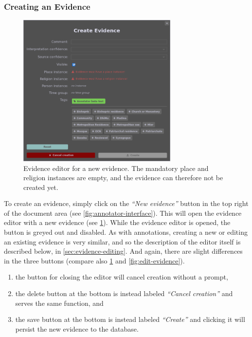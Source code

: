 \subsubsection{Creating an Evidence}
\label{sec:evidence-creation}

\begin{figure}[htb]
  \centering
  \includegraphics[width=8cm]{../src/assets/annotator-documentation/create-evidence.png}

  \caption{
    Evidence editor for a new evidence.
    The mandatory place and religion instances are empty, and the evidence can therefore not be created yet.
  }
  \label{fig:create-evidence}
\end{figure}

To create an evidence, simply click on the \emph{\enquote{New evidence}} button in the top right of the document area (see \cref{fig:annotator-interface}).
This will open the evidence editor with a new evidence (see \cref{fig:create-evidence}).
While the evidence editor is opened, the button is greyed out and disabled.
As with annotations, creating a new or editing an existing evidence is very similar, and so the description of the editor itself is described below, in \cref{sec:evidence-editing}.
And again, there are slight differences in the three buttons (compare also \cref{fig:create-evidence} and \cref{fig:edit-evidence}).

\begin{enumerate}
  \item the button for closing the editor will cancel creation without a prompt,
  \item the delete button at the bottom is instead labeled \emph{\enquote{Cancel creation}} and serves the same function, and
  \item the save button at the bottom is instead labeled \emph{\enquote{Create}} and clicking it will persist the new evidence to the database.
\end{enumerate}


